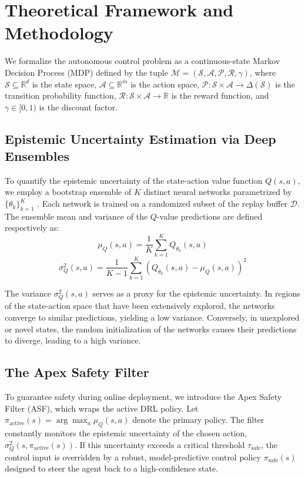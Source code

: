 \section{Theoretical Framework and Methodology}

We formalize the autonomous control problem as a continuous-state Markov Decision Process (MDP) defined by the tuple $\mathcal{M} = (\mathcal{S}, \mathcal{A}, \mathcal{P}, \mathcal{R}, \gamma)$, where $\mathcal{S} \subseteq \mathbb{R}^d$ is the state space, $\mathcal{A} \subseteq \mathbb{R}^m$ is the action space, $\mathcal{P}: \mathcal{S} \times \mathcal{A} \to \Delta(\mathcal{S})$ is the transition probability function, $\mathcal{R}: \mathcal{S} \times \mathcal{A} \to \mathbb{R}$ is the reward function, and $\gamma \in [0, 1)$ is the discount factor.

\subsection{Epistemic Uncertainty Estimation via Deep Ensembles}

To quantify the epistemic uncertainty of the state-action value function $Q(s, a)$, we employ a bootstrap ensemble of $K$ distinct neural networks parametrized by $\{\theta_k\}_{k=1}^K$ \cite{marchetti2023calibration}. Each network is trained on a randomized subset of the replay buffer $\mathcal{D}$. The ensemble mean and variance of the $Q$-value predictions are defined respectively as:
\begin{equation}
    \mu_Q(s, a) = \frac{1}{K} \sum_{k=1}^K Q_{\theta_k}(s, a)
\end{equation}
\begin{equation}
    \sigma^2_Q(s, a) = \frac{1}{K - 1} \sum_{k=1}^K \left( Q_{\theta_k}(s, a) - \mu_Q(s, a) \right)^2
\end{equation}

The variance $\sigma^2_Q(s, a)$ serves as a proxy for the epistemic uncertainty. In regions of the state-action space that have been extensively explored, the networks converge to similar predictions, yielding a low variance. Conversely, in unexplored or novel states, the random initialization of the networks causes their predictions to diverge, leading to a high variance.

\subsection{The Apex Safety Filter}

To guarantee safety during online deployment, we introduce the Apex Safety Filter (ASF), which wraps the active DRL policy. Let $\pi_{\text{active}}(s) = \arg\max_a \mu_Q(s, a)$ denote the primary policy. The filter constantly monitors the epistemic uncertainty of the chosen action, $\sigma^2_Q(s, \pi_{\text{active}}(s))$. If this uncertainty exceeds a critical threshold $\tau_{\text{safe}}$, the control input is overridden by a robust, model-predictive control policy $\pi_{\text{safe}}(s)$ designed to steer the agent back to a high-confidence state.

